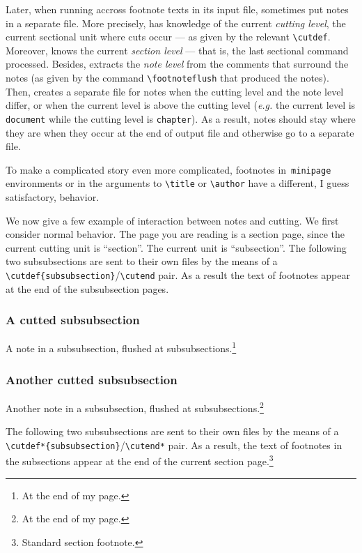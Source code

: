 Later, when running accross footnote texts in its input file, \hacha{}
sometimes put notes in a separate file.
More precisely, \hacha{} has knowledge of the
current \emph{cutting level}, the current sectional unit where
cuts occur --- as given by the relevant \verb+\cutdef+.
Moreover, \hacha{} knows the current \emph{section level} ---
that is, the last sectional command processed.
Besides, \hacha{} extracts the \emph{note level} from the comments
that surround the notes (as given by the command
\verb+\footnoteflush+ that produced the notes).
Then, \hacha{} creates a separate file for notes
when the cutting level and the note level differ,
or when the current level is above the cutting level
(\emph{e.g.} the current level is \texttt{document} while the cutting
level is \texttt{chapter}).
As a result, notes should stay where they are when they occur at the end of
\hacha{} output file and otherwise go to a separate file.

To make a complicated story even more complicated,
footnotes in~\texttt{minipage} environments or in the arguments
to \verb+\title+ or \verb+\author+ have a different, I guess satisfactory,
behavior.

\ifhevea
We now give a few example of interaction between notes and cutting.
We first consider normal behavior.
The page you are reading is a section page, since the current
cutting unit is ``section''. The current unit is ``subsection''.
The following two subsubsections are sent to their own files by
the means of a \verb+\cutdef{subsubsection}+/\verb+\cutend+ pair.
As a result the text of footnotes appear at the end of the
subsubsection pages.
\subsubsection{A cutted subsubsection}
A note in a subsubsection, flushed at subsubsections.\footnote{At the
end of my page.}
\subsubsection{Another cutted subsubsection}
Another note in a subsubsection, flushed at subsubsections.\footnote{At the
end of my page.}
\cutend

The following two subsubsections are sent to their own files by
the means of a \verb+\cutdef*{subsubsection}+/\verb+\cutend*+ pair.
As a result, the text of footnotes in the subsections appear
at the end of the current section page.\footnote{Standard section footnote.}
